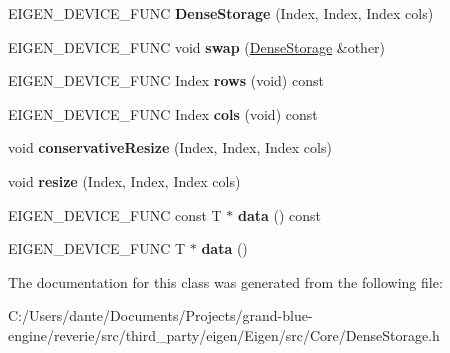 \begin{DoxyCompactItemize}
E\+I\+G\+E\+N\+\_\+\+D\+E\+V\+I\+C\+E\+\_\+\+F\+U\+NC {\bfseries Dense\+Storage} (Index, Index, Index cols)
\item 
\mbox{\label{class_eigen_1_1_dense_storage_3_01_t_00_01_size_00_01___rows_00_01_dynamic_00_01___options_01_4_a1251a20fcac77be824d2c7693f886e90}} 
E\+I\+G\+E\+N\+\_\+\+D\+E\+V\+I\+C\+E\+\_\+\+F\+U\+NC void {\bfseries swap} (\mbox{\hyperlink{class_eigen_1_1_dense_storage}{Dense\+Storage}} \&other)
\item 
\mbox{\label{class_eigen_1_1_dense_storage_3_01_t_00_01_size_00_01___rows_00_01_dynamic_00_01___options_01_4_a0c790887e2a667cc6e9cfde8b66daede}} 
E\+I\+G\+E\+N\+\_\+\+D\+E\+V\+I\+C\+E\+\_\+\+F\+U\+NC Index {\bfseries rows} (void) const
\item 
\mbox{\label{class_eigen_1_1_dense_storage_3_01_t_00_01_size_00_01___rows_00_01_dynamic_00_01___options_01_4_a30e4e4a8d9955dd23802be87ea629cb0}} 
E\+I\+G\+E\+N\+\_\+\+D\+E\+V\+I\+C\+E\+\_\+\+F\+U\+NC Index {\bfseries cols} (void) const
\item 
\mbox{\label{class_eigen_1_1_dense_storage_3_01_t_00_01_size_00_01___rows_00_01_dynamic_00_01___options_01_4_a1ddaadaeae7c2480c7fc7e2c2f083c0a}} 
void {\bfseries conservative\+Resize} (Index, Index, Index cols)
\item 
\mbox{\label{class_eigen_1_1_dense_storage_3_01_t_00_01_size_00_01___rows_00_01_dynamic_00_01___options_01_4_a67d531fdf50724450693b0016a7fbd1a}} 
void {\bfseries resize} (Index, Index, Index cols)
\item 
\mbox{\label{class_eigen_1_1_dense_storage_3_01_t_00_01_size_00_01___rows_00_01_dynamic_00_01___options_01_4_abc6a40ceb60a7351a903c1bb9f0548e4}} 
E\+I\+G\+E\+N\+\_\+\+D\+E\+V\+I\+C\+E\+\_\+\+F\+U\+NC const T $\ast$ {\bfseries data} () const
\item 
\mbox{\label{class_eigen_1_1_dense_storage_3_01_t_00_01_size_00_01___rows_00_01_dynamic_00_01___options_01_4_ac0aac3e4072b2a62f013ccb20faaf70c}} 
E\+I\+G\+E\+N\+\_\+\+D\+E\+V\+I\+C\+E\+\_\+\+F\+U\+NC T $\ast$ {\bfseries data} ()
\end{DoxyCompactItemize}


The documentation for this class was generated from the following file\+:\begin{DoxyCompactItemize}
\item 
C\+:/\+Users/dante/\+Documents/\+Projects/grand-\/blue-\/engine/reverie/src/third\+\_\+party/eigen/\+Eigen/src/\+Core/Dense\+Storage.\+h\end{DoxyCompactItemize}

